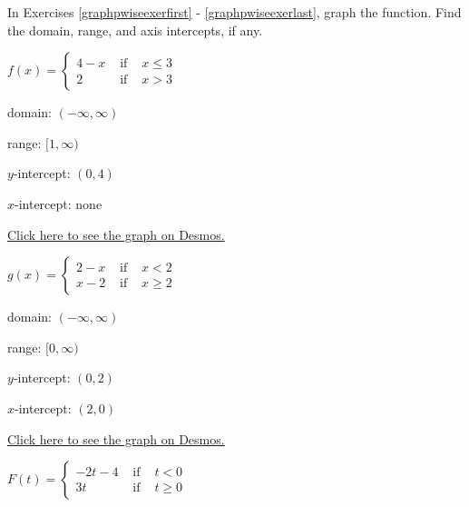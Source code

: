 \documentclass{ximera}
\begin{document}
\begin{question}
In Exercises \ref{graphpwiseexerfirst} - \ref{graphpwiseexerlast}, graph the function.  Find the domain, range, and axis intercepts, if any.

\begin{problem}\label{graphpwiseexerfirst}
$f(x) = \left\{ \begin{array}{rcl} 4-x & \mbox{ if } &  x \leq 3 \\         2 & \mbox{ if } & x > 3
\end{array} \right.$ 

\begin{solution}

domain: $(-\infty, \infty)$

range:  $[1, \infty)$

$y$-intercept:  $(0,4)$

$x$-intercept: none

\href{https://www.desmos.com/calculator/qo9nbl1oiv}{Click here to see the graph on Desmos.}

\end{solution}

\end{problem}

\begin{problem}
$g(x) = \left\{ \begin{array}{rcl} 2-x & \mbox{ if } &  x < 2 \\          x-2 & \mbox{ if } & x \geq  2
 \end{array} \right.$

\begin{solution}

domain: $(-\infty, \infty)$

range:  $[0, \infty)$

$y$-intercept:  $(0,2)$

$x$-intercept: $(2,0)$

\href{https://www.desmos.com/calculator/l8ga8eqped}{Click here to see the graph on Desmos.}

\end{solution}

\end{problem}

\begin{problem}
$F(t) = \left\{ \begin{array}{rcl} -2t - 4 & \mbox{ if } &  t < 0 \\
 3t & \mbox{ if } & t \geq 0
\end{array} \right.$


\end{problem}
\end{question}
\end{document}
